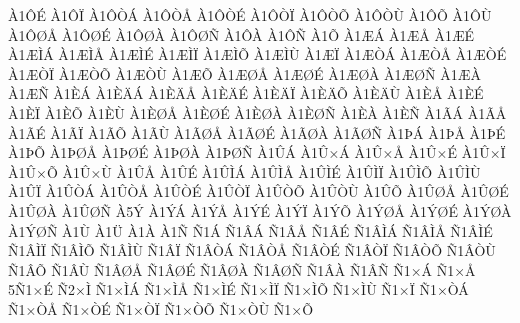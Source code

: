 {^^c01^^d4^^c9
^^c01^^d4^^cf
^^c01^^d4^^d2^^c1
^^c01^^d4^^d2^^c5
^^c01^^d4^^d2^^c9
^^c01^^d4^^d2^^cf
^^c01^^d4^^d2^^d5
^^c01^^d4^^d2^^d9
^^c01^^d4^^d5
^^c01^^d4^^d9
^^c01^^d4^^d8^^c5
^^c01^^d4^^d8^^c9
^^c01^^d4^^d8^^c0
^^c01^^d4^^d8^^d1
^^c01^^d4^^c0
^^c01^^d4^^d1
^^c01^^d5
^^c01^^c6^^c1
^^c01^^c6^^c5
^^c01^^c6^^c9
^^c01^^c6^^cc^^c1
^^c01^^c6^^cc^^c5
^^c01^^c6^^cc^^c9
^^c01^^c6^^cc^^cf
^^c01^^c6^^cc^^d5
^^c01^^c6^^cc^^d9
^^c01^^c6^^cf
^^c01^^c6^^d2^^c1
^^c01^^c6^^d2^^c5
^^c01^^c6^^d2^^c9
^^c01^^c6^^d2^^cf
^^c01^^c6^^d2^^d5
^^c01^^c6^^d2^^d9
^^c01^^c6^^d5
^^c01^^c6^^d8^^c5
^^c01^^c6^^d8^^c9
^^c01^^c6^^d8^^c0
^^c01^^c6^^d8^^d1
^^c01^^c6^^c0
^^c01^^c6^^d1
^^c01^^c8^^c1
^^c01^^c8^^c4^^c1
^^c01^^c8^^c4^^c5
^^c01^^c8^^c4^^c9
^^c01^^c8^^c4^^cf
^^c01^^c8^^c4^^d5
^^c01^^c8^^c4^^d9
^^c01^^c8^^c5
^^c01^^c8^^c9
^^c01^^c8^^cf
^^c01^^c8^^d5
^^c01^^c8^^d9
^^c01^^c8^^d8^^c5
^^c01^^c8^^d8^^c9
^^c01^^c8^^d8^^c0
^^c01^^c8^^d8^^d1
^^c01^^c8^^c0
^^c01^^c8^^d1
^^c01^^c3^^c1
^^c01^^c3^^c5
^^c01^^c3^^c9
^^c01^^c3^^cf
^^c01^^c3^^d5
^^c01^^c3^^d9
^^c01^^c3^^d8^^c5
^^c01^^c3^^d8^^c9
^^c01^^c3^^d8^^c0
^^c01^^c3^^d8^^d1
^^c01^^de^^c1
^^c01^^de^^c5
^^c01^^de^^c9
^^c01^^de^^d5
^^c01^^de^^d8^^c5
^^c01^^de^^d8^^c9
^^c01^^de^^d8^^c0
^^c01^^de^^d8^^d1
^^c01^^db^^c1
^^c01^^db^^d7^^c1
^^c01^^db^^d7^^c5
^^c01^^db^^d7^^c9
^^c01^^db^^d7^^cf
^^c01^^db^^d7^^d5
^^c01^^db^^d7^^d9
^^c01^^db^^c5
^^c01^^db^^c9
^^c01^^db^^cc^^c1
^^c01^^db^^cc^^c5
^^c01^^db^^cc^^c9
^^c01^^db^^cc^^cf
^^c01^^db^^cc^^d5
^^c01^^db^^cc^^d9
^^c01^^db^^cf
^^c01^^db^^d2^^c1
^^c01^^db^^d2^^c5
^^c01^^db^^d2^^c9
^^c01^^db^^d2^^cf
^^c01^^db^^d2^^d5
^^c01^^db^^d2^^d9
^^c01^^db^^d5
^^c01^^db^^d8^^c5
^^c01^^db^^d8^^c9
^^c01^^db^^d8^^c0
^^c01^^db^^d8^^d1
^^c05^^dd
^^c01^^dd^^c1
^^c01^^dd^^c5
^^c01^^dd^^c9
^^c01^^dd^^cf
^^c01^^dd^^d5
^^c01^^dd^^d8^^c5
^^c01^^dd^^d8^^c9
^^c01^^dd^^d8^^c0
^^c01^^dd^^d8^^d1
^^c01^^d9
^^c01^^dc
^^c01^^c0
^^c01^^d1
^^d11^^c1
^^d11^^c2^^c1
^^d11^^c2^^c5
^^d11^^c2^^c9
^^d11^^c2^^cc^^c1
^^d11^^c2^^cc^^c5
^^d11^^c2^^cc^^c9
^^d11^^c2^^cc^^cf
^^d11^^c2^^cc^^d5
^^d11^^c2^^cc^^d9
^^d11^^c2^^cf
^^d11^^c2^^d2^^c1
^^d11^^c2^^d2^^c5
^^d11^^c2^^d2^^c9
^^d11^^c2^^d2^^cf
^^d11^^c2^^d2^^d5
^^d11^^c2^^d2^^d9
^^d11^^c2^^d5
^^d11^^c2^^d9
^^d11^^c2^^d8^^c5
^^d11^^c2^^d8^^c9
^^d11^^c2^^d8^^c0
^^d11^^c2^^d8^^d1
^^d11^^c2^^c0
^^d11^^c2^^d1
^^d11^^d7^^c1
^^d11^^d7^^c5
5^^d11^^d7^^c9
^^d12^^d7^^cc
^^d11^^d7^^cc^^c1
^^d11^^d7^^cc^^c5
^^d11^^d7^^cc^^c9
^^d11^^d7^^cc^^cf
^^d11^^d7^^cc^^d5
^^d11^^d7^^cc^^d9
^^d11^^d7^^cf
^^d11^^d7^^d2^^c1
^^d11^^d7^^d2^^c5
^^d11^^d7^^d2^^c9
^^d11^^d7^^d2^^cf
^^d11^^d7^^d2^^d5
^^d11^^d7^^d2^^d9
^^d11^^d7^^d5
}
